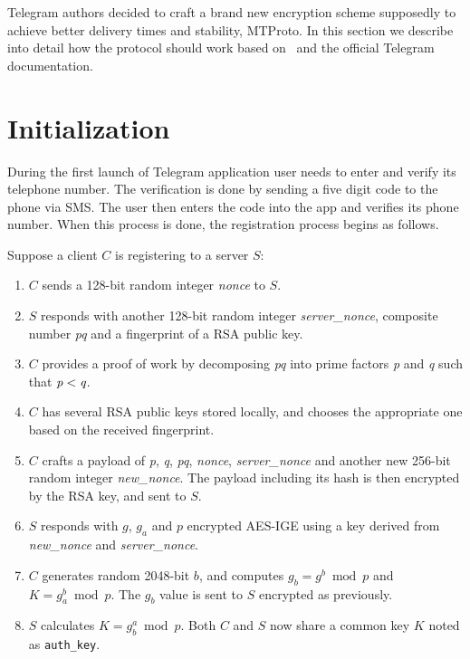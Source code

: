 \documentclass[thesis=M,english]{FITthesis}[2012/10/20]
\begin{document}
Telegram authors decided to craft a brand new encryption scheme supposedly to achieve better delivery times and stability, MTProto. In this section we describe into detail how the protocol should work based on~\cite{telegram-aarhus} and the official Telegram documentation.


\section{Initialization}\label{crypto-initialization}

During the first launch of Telegram application user needs to enter and verify its telephone number. The verification is done by sending a five digit code to the phone via SMS. The user then enters the code into the app and verifies its phone number. When this process is done, the registration process begins as follows.

Suppose a client $C$ is registering to a server $S$:

\begin{enumerate}
	\item $C$ sends a 128-bit random integer \emph{nonce} to $S$.
	\item $S$ responds with another 128-bit random integer \emph{server\_nonce}, composite number \emph{pq} and a fingerprint of a RSA public key.
	\item $C$ provides a proof of work by decomposing \emph{pq} into prime factors \emph{p} and \emph{q} such that $\emph{p} < \emph{q}$.
	\item $C$ has several RSA public keys stored locally, and chooses the appropriate one based on the received fingerprint.
	\item $C$ crafts a payload of \emph{p}, \emph{q}, \emph{pq}, \emph{nonce}, \emph{server\_nonce} and another new 256-bit random integer \emph{new\_nonce}. The payload including its hash is then encrypted by the RSA key, and sent to $S$.
	\item $S$ responds with $g$, $g_a$ and $p$ encrypted AES-IGE using a key derived from \emph{new\_nonce} and \emph{server\_nonce}.\label{crypto-initialization-6}
	\item $C$ generates random 2048-bit $b$, and computes $g_b = g^b \bmod p$ and $K = g_a^b \bmod p$. The $g_b$ value is sent to $S$ encrypted as previously.
	\item $S$ calculates $K = g_b^a \bmod p$. Both $C$ and $S$ now share a common key $K$ noted as \texttt{auth\_key}.
\end{enumerate}
\end{document}
